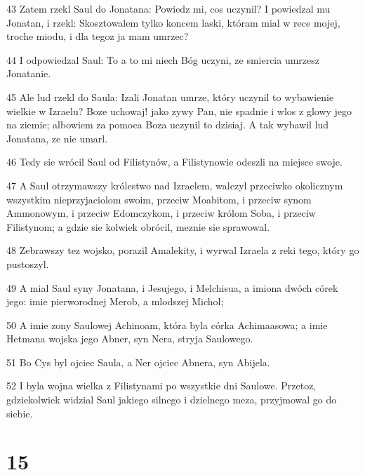 \par 43 Zatem rzekl Saul do Jonatana: Powiedz mi, cos uczynil? I powiedzal mu Jonatan, i rzekl: Skosztowalem tylko koncem laski, któram mial w rece mojej, troche miodu, i dla tegoz ja mam umrzec?
\par 44 I odpowiedzal Saul: To a to mi niech Bóg uczyni, ze smiercia umrzesz Jonatanie.
\par 45 Ale lud rzekl do Saula: Izali Jonatan umrze, który uczynil to wybawienie wielkie w Izraelu? Boze uchowaj! jako zywy Pan, nie spadnie i wlos z glowy jego na ziemie; albowiem za pomoca Boza uczynil to dzisiaj. A tak wybawil lud Jonatana, ze nie umarl.
\par 46 Tedy sie wrócil Saul od Filistynów, a Filistynowie odeszli na miejsce swoje.
\par 47 A Saul otrzymawszy królestwo nad Izraelem, walczyl przeciwko okolicznym wszystkim nieprzyjaciolom swoim, przeciw Moabitom, i przeciw synom Ammonowym, i przeciw Edomczykom, i przeciw królom Soba, i przeciw Filistynom; a gdzie sie kolwiek obrócil, meznie sie sprawowal.
\par 48 Zebrawszy tez wojsko, porazil Amalekity, i wyrwal Izraela z reki tego, który go pustoszyl.
\par 49 A mial Saul syny Jonatana, i Jesujego, i Melchisua, a imiona dwóch córek jego: imie pierworodnej Merob, a mlodszej Michol;
\par 50 A imie zony Saulowej Achinoam, która byla córka Achimaasowa; a imie Hetmana wojska jego Abner, syn Nera, stryja Saulowego.
\par 51 Bo Cys byl ojciec Saula, a Ner ojciec Abnera, syn Abijela.
\par 52 I byla wojna wielka z Filistynami po wszystkie dni Saulowe. Przetoz, gdziekolwiek widzial Saul jakiego silnego i dzielnego meza, przyjmowal go do siebie.

\chapter{15}

